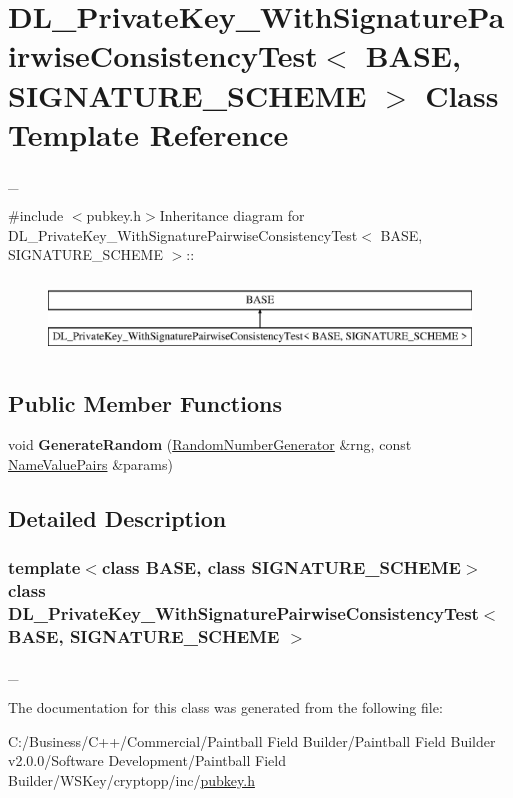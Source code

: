 \hypertarget{class_d_l___private_key___with_signature_pairwise_consistency_test}{
\section{DL\_\-PrivateKey\_\-WithSignaturePairwiseConsistencyTest$<$ BASE, SIGNATURE\_\-SCHEME $>$ Class Template Reference}
\label{class_d_l___private_key___with_signature_pairwise_consistency_test}
}


\_\-  


{\ttfamily \#include $<$pubkey.h$>$}Inheritance diagram for DL\_\-PrivateKey\_\-WithSignaturePairwiseConsistencyTest$<$ BASE, SIGNATURE\_\-SCHEME $>$::\begin{figure}[H]
\begin{center}
\leavevmode
\includegraphics[height=2cm]{class_d_l___private_key___with_signature_pairwise_consistency_test}
\end{center}
\end{figure}
\subsection*{Public Member Functions}
\begin{DoxyCompactItemize}
\item 
\hypertarget{class_d_l___private_key___with_signature_pairwise_consistency_test_ac3322b0c4d21d3eb4ee463b3c4d89087}{
void {\bfseries GenerateRandom} (\hyperlink{class_random_number_generator}{RandomNumberGenerator} \&rng, const \hyperlink{class_name_value_pairs}{NameValuePairs} \&params)}
\label{class_d_l___private_key___with_signature_pairwise_consistency_test_ac3322b0c4d21d3eb4ee463b3c4d89087}

\end{DoxyCompactItemize}


\subsection{Detailed Description}
\subsubsection*{template$<$class BASE, class SIGNATURE\_\-SCHEME$>$ class DL\_\-PrivateKey\_\-WithSignaturePairwiseConsistencyTest$<$ BASE, SIGNATURE\_\-SCHEME $>$}

\_\- 

The documentation for this class was generated from the following file:\begin{DoxyCompactItemize}
\item 
C:/Business/C++/Commercial/Paintball Field Builder/Paintball Field Builder v2.0.0/Software Development/Paintball Field Builder/WSKey/cryptopp/inc/\hyperlink{pubkey_8h}{pubkey.h}\end{DoxyCompactItemize}
